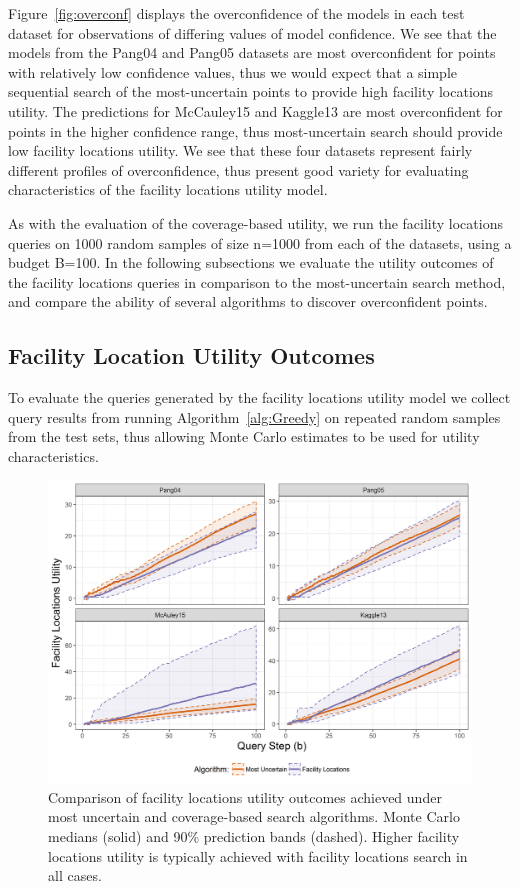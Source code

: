 \documentclass[letterpaper]{article} %
\newcommand{\km}[1]{{\color{red} #1}} %
\begin{document}
\km{Figure~\ref{fig:overconf} displays the overconfidence of the models in each test dataset for observations of differing values of model confidence. We see that the models from the Pang04 and Pang05 datasets are most overconfident for points with relatively low confidence values, thus we would expect that a simple sequential search of the most-uncertain points to provide high facility locations utility. The predictions for McCauley15 and Kaggle13 are most overconfident for points in the higher confidence range, thus most-uncertain search should provide low facility locations utility. We see that these four datasets represent fairly different profiles of overconfidence, thus present good variety for evaluating characteristics of the facility locations utility model. }

As with the evaluation of the coverage-based utility, we run the facility locations queries on 1000 random samples of size n=1000 from each of the datasets, using a budget B=100. In the following subsections we evaluate the utility outcomes of the facility locations queries in comparison to the most-uncertain search method, and compare the ability of several algorithms to discover overconfident points.

\subsection{Facility Location Utility Outcomes}

To evaluate the queries generated by the facility locations utility model we collect query results from running Algorithm~\ref{alg:Greedy} on repeated random samples from the test sets, thus allowing Monte Carlo estimates to be used for utility characteristics. 

\begin{figure}[t]
 \centering
  \includegraphics[width=\textwidth]{flUtilPlaceholder.png}
  \caption{Comparison of facility locations utility outcomes achieved under most uncertain and coverage-based search algorithms. Monte Carlo medians (solid) and 90\% prediction bands (dashed).  Higher facility locations utility is typically achieved with facility locations search in all cases.}
  \label{fig:flutil}
\end{figure}
\end{document}
